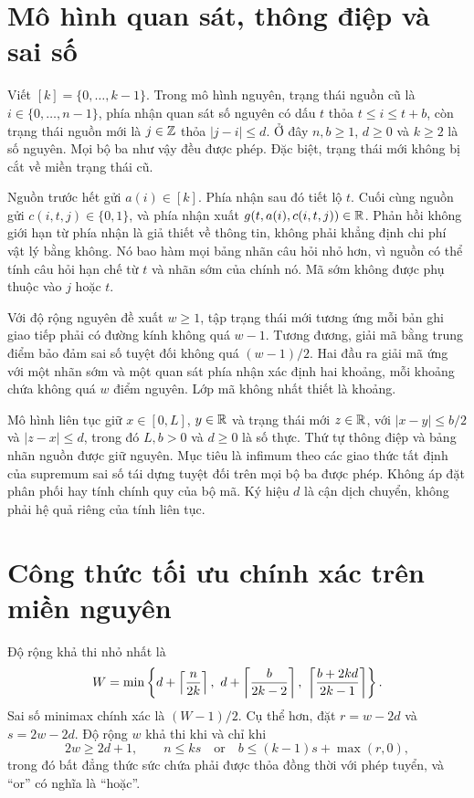 \section{Mô hình quan sát, thông điệp và sai số}
Viết $[k]=\{0,\ldots,k-1\}$. Trong mô hình nguyên, trạng thái nguồn cũ là $i\in\{0,\ldots,n-1\}$, phía nhận quan sát số nguyên có dấu $t$ thỏa $t\leq i\leq t+b$, còn trạng thái nguồn mới là $j\in\mathbb Z$ thỏa $|j-i|\leq d$. Ở đây $n,b\geq1$, $d\geq0$ và $k\geq2$ là số nguyên. Mọi bộ ba như vậy đều được phép. Đặc biệt, trạng thái mới không bị cắt về miền trạng thái cũ.

Nguồn trước hết gửi $a(i)\in[k]$. Phía nhận sau đó tiết lộ $t$. Cuối cùng nguồn gửi $c(i,t,j)\in\{0,1\}$, và phía nhận xuất $g(t,a(i),c(i,t,j))\in\mathbb R$. Phản hồi không giới hạn từ phía nhận là giả thiết về thông tin, không phải khẳng định chi phí vật lý bằng không. Nó bao hàm mọi bảng nhãn câu hỏi nhỏ hơn, vì nguồn có thể tính câu hỏi hạn chế từ $t$ và nhãn sớm của chính nó. Mã sớm không được phụ thuộc vào $j$ hoặc $t$.

Với độ rộng nguyên đề xuất $w\geq1$, tập trạng thái mới tương ứng mỗi bản ghi giao tiếp phải có đường kính không quá $w-1$. Tương đương, giải mã bằng trung điểm bảo đảm sai số tuyệt đối không quá $(w-1)/2$. Hai đầu ra giải mã ứng với một nhãn sớm và một quan sát phía nhận xác định hai khoảng, mỗi khoảng chứa không quá $w$ điểm nguyên. Lớp mã không nhất thiết là khoảng.

Mô hình liên tục giữ $x\in[0,L]$, $y\in\mathbb R$ và trạng thái mới $z\in\mathbb R$, với $|x-y|\leq b/2$ và $|z-x|\leq d$, trong đó $L,b>0$ và $d\geq0$ là số thực. Thứ tự thông điệp và bảng nhãn nguồn được giữ nguyên. Mục tiêu là infimum theo các giao thức tất định của supremum sai số tái dựng tuyệt đối trên mọi bộ ba được phép. Không áp đặt phân phối hay tính chính quy của bộ mã. Ký hiệu $d$ là cận dịch chuyển, không phải hệ quả riêng của tính liên tục.

\section{Công thức tối ưu chính xác trên miền nguyên}
\begin{theorem}\label{B-thm:integer}
Độ rộng khả thi nhỏ nhất là
\begin{equation}\label{B-eq:W}
W=\min\left\{d+\ceil{\frac{n}{2k}},\ d+\ceil{\frac{b}{2k-2}},\ \ceil{\frac{b+2kd}{2k-1}}\right\}.
\end{equation}
Sai số minimax chính xác là $(W-1)/2$. Cụ thể hơn, đặt $r=w-2d$ và $s=2w-2d$. Độ rộng $w$ khả thi khi và chỉ khi
\begin{equation}\label{B-eq:threshold}
2w\geq2d+1,\qquad n\leq ks\quad\text{or}\quad b\leq(k-1)s+\max(r,0),
\end{equation}
trong đó bất đẳng thức sức chứa phải được thỏa đồng thời với phép tuyển, và ``or'' có nghĩa là ``hoặc''.
\end{theorem}

